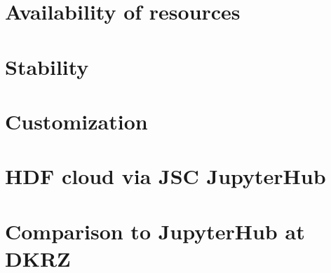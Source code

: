 \documentclass[11pt,a4paper]{article}
\begin{document}
\section{Availability of resources}
\label{s-availability-resources}


\section{Stability}
\label{s-stability}


\section{Customization}
\label{s-customization}


\section{HDF cloud via JSC JupyterHub}
\label{s-hdfcloud-jsc-jhub}


\section{Comparison to JupyterHub at DKRZ}
\label{s-comparison-dkrz}



\end{document}
